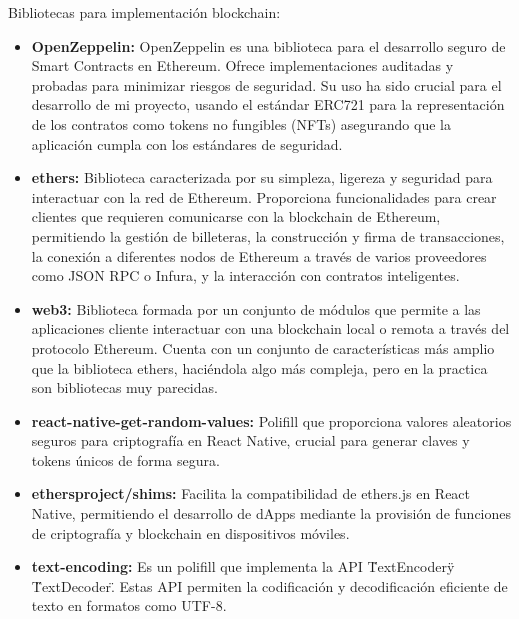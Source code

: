 Bibliotecas para implementación blockchain:
\begin{itemize}

\item \textbf{OpenZeppelin:} OpenZeppelin es una biblioteca para el desarrollo seguro de Smart Contracts en Ethereum. Ofrece implementaciones auditadas y probadas para minimizar riesgos de seguridad.
Su uso ha sido crucial para el desarrollo de mi proyecto, usando el estándar ERC721 para la representación de los contratos como tokens no fungibles (NFTs) asegurando que la aplicación cumpla con los estándares de seguridad.

\item \textbf{ethers:} Biblioteca caracterizada por su simpleza, ligereza y seguridad para interactuar con la red de Ethereum. Proporciona funcionalidades para crear clientes que requieren comunicarse con la blockchain de Ethereum, permitiendo la gestión de billeteras, la construcción y firma de transacciones, la conexión a diferentes nodos de Ethereum a través de varios proveedores como JSON RPC o Infura, y la interacción con contratos inteligentes.

\item \textbf{web3:} Biblioteca formada por un conjunto de módulos que permite a las aplicaciones cliente interactuar con una blockchain local o remota a través del protocolo Ethereum. 
Cuenta con un conjunto de características más amplio que la biblioteca ethers, haciéndola algo más compleja, pero en la practica son bibliotecas muy parecidas.

\item \textbf{react-native-get-random-values:} Polifill que proporciona valores aleatorios seguros para criptografía en React Native, crucial para generar claves y tokens únicos de forma segura.

\item \textbf{ethersproject/shims:} Facilita la compatibilidad de ethers.js en React Native, permitiendo el desarrollo de dApps mediante la provisión de funciones de criptografía y blockchain en dispositivos móviles.

\item \textbf{text-encoding:} Es un polifill que implementa la API \"TextEncoder\" y \"TextDecoder\". Estas API permiten la codificación y decodificación eficiente de texto en formatos como UTF-8.

\end{itemize}


